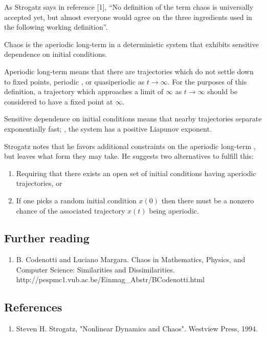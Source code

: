 \documentclass[12pt]{article}
\begin{document}
As Strogatz says in reference [1], ``No definition of the term chaos is universally accepted yet, but almost everyone would agree on the three ingredients used in the following working definition''.

Chaos is the aperiodic long-term  in a deterministic system that exhibits sensitive dependence on initial conditions.

Aperiodic long-term  means that there are trajectories which do not settle down to fixed points, periodic , or quasiperiodic  as $t \to \infty$. For the purposes of this definition, a trajectory which approaches a limit of $\infty$ as $t \to \infty$ should be considered to have a fixed point at $\infty$.

Sensitive dependence on initial conditions means that nearby trajectories separate exponentially fast; , the system has a positive Liapunov exponent.

Strogatz notes that he favors additional constraints on the aperiodic long-term , but leaves  what form they may take. He suggests two alternatives to fulfill this:

\begin{enumerate}
\item Requiring that there exists an open set of initial conditions having aperiodic trajectories, or
\item If one picks a random initial condition $x(0)$ then there must be a nonzero chance of the associated trajectory $x(t)$ being aperiodic.
\end{enumerate}

\subsection{Further reading}
\begin{enumerate}
\item  B. Codenotti and Luciano Margara. Chaos in Mathematics, Physics, and Computer Science: Similarities and Dissimilarities. http://pespmc1.vub.ac.be/Einmag\_Abstr/BCodenotti.html
\end{enumerate}

\subsection{References}
\begin{enumerate}
\item Steven H. Strogatz, "Nonlinear Dynamics and Chaos". Westview Press, 1994.
\end{enumerate}
\end{document}
